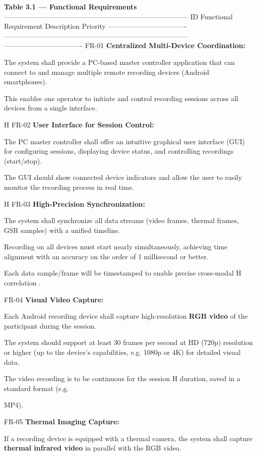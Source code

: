 \textbf{Table 3.1 --- Functional Requirements}
-------------------------------------------------------------------------------- ID Functional Requirement Description Priority ---------------------------------- -------------------------------------------------------------------------------- ---------------------------------- FR-01 \textbf{Centralized Multi-Device Coordination:}

The system shall provide a PC-based master controller application that can
connect to and manage multiple remote recording devices (Android smartphones).

This enables one operator to initiate and control recording sessions across all
devices from a single interface.

H FR-02 \textbf{User Interface for Session Control:}

The PC master controller shall offer an intuitive graphical user interface (GUI)
for configuring sessions, displaying device status, and controlling recordings
(start/stop).

The GUI should show connected device indicators and allow the user to easily
monitor the recording process in real time.

H FR-03 \textbf{High-Precision Synchronization:}

The system shall synchronize all data streams (video frames, thermal frames, GSR
samples) with a unified timeline.

Recording on all devices must start nearly simultaneously, achieving time
alignment with an accuracy on the order of 1 millisecond or better.

Each data sample/frame will be timestamped to enable precise cross-modal H
correlation .

FR-04 \textbf{Visual Video Capture:}

Each Android recording device shall capture high-resolution \textbf{RGB video}
 of the participant during the session.

The system should support at least 30 frames per second at HD (720p) resolution
or higher (up to the device's capabilities, e.g. 1080p or 4K) for detailed
visual data.

The video recording is to be continuous for the session H duration, saved in a
standard format (e.g.

MP4).

FR-05 \textbf{Thermal Imaging Capture:}

If a recording device is equipped with a thermal camera, the system shall capture \textbf{thermal infrared video}
 in parallel with the RGB video.

